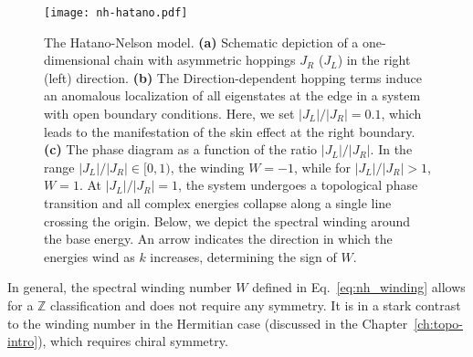 \begin{figure}[H]
\centering
\texttt{[image: nh-hatano.pdf]}
\caption[The Hatano-Nelson model]{The Hatano-Nelson model. \textbf{(a)} Schematic depiction of a one-dimensional chain with asymmetric hoppings $J_R$ ($J_L$) in the right (left) direction. \textbf{(b)} The Direction-dependent hopping terms induce an anomalous localization of all eigenstates at the edge in a system with open boundary conditions. Here, we set $|J_L| / | J_R | = 0.1$, which leads to the manifestation of the skin effect at the right boundary. \textbf{(c)} The phase diagram as a function of the ratio $|J_L| / | J_R |$. In the range $|J_L| / | J_R | \in [0, 1)$, the winding $W = -1$, while for $|J_L| / | J_R | > 1$, $W = 1$. At $|J_L| / | J_R | =1$, the system undergoes a topological phase transition and all complex energies collapse along a single line crossing the origin. Below, we depict the spectral winding around the base energy. An arrow indicates the direction in which the energies wind as $k$ increases, determining the sign of $W$.}
\label{fig:hatano-nelson}
\end{figure}

In general, the spectral winding number $W$ defined in Eq.~\eqref{eq:nh_winding} allows for a $\mathbb{Z}$ classification and does not require any symmetry. It is in a stark contrast to the winding number in the Hermitian case (discussed in the Chapter~\ref{ch:topo-intro}), which requires chiral symmetry.

